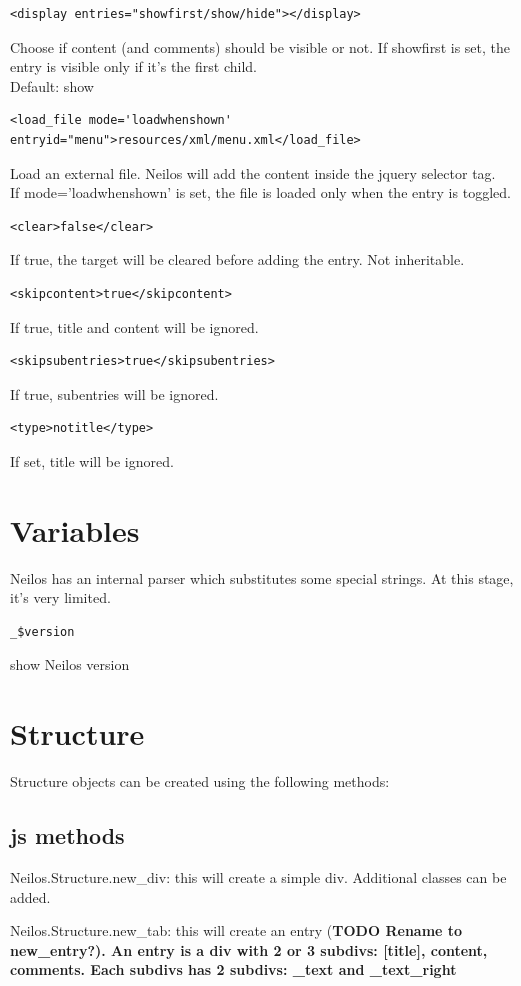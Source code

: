 \documentclass[a4paper,12pt]{article}
\begin{document}
\begin{list}{-}{}
\begin{verbatim}
<display entries="showfirst/show/hide"></display>
\end{verbatim}
Choose if content (and comments) should be visible or not. If showfirst is set, the entry is visible only if it's the first child.\\
Default: show
\item \begin{verbatim}
<load_file mode='loadwhenshown' 
entryid="menu">resources/xml/menu.xml</load_file>
      \end{verbatim}
Load an external file. Neilos will add the content inside the jquery selector tag.\\
If mode='loadwhenshown' is set, the file is loaded only when the entry is toggled.
\item \begin{verbatim}
<clear>false</clear>
\end{verbatim}
If true, the target will be cleared before adding the entry. Not inheritable.
\item \begin{verbatim}
<skipcontent>true</skipcontent>
\end{verbatim}
If true, title and content will be ignored.
\item \begin{verbatim}
<skipsubentries>true</skipsubentries>
\end{verbatim}
If true, subentries will be ignored.
\item \begin{verbatim}
<type>notitle</type>
\end{verbatim}
If set, title will be ignored.
\end{list}
\normalsize
\section{Variables}
Neilos has an internal parser which substitutes some special strings. At this stage, it's very limited.
\begin{list}{-}{}
\item \begin{verbatim}
_$version
\end{verbatim}
show Neilos version
\end{list}
\normalsize
\section{Structure}
Structure objects can be created using the following methods:
\subsection{js methods}
\begin{list}{-}{}
 \item Neilos.Structure.new\_div: this will create a simple div. Additional classes can be added.
\item Neilos.Structure.new\_tab: this will create an entry (\bfseries{TODO} \normalfont Rename to new\_entry?). An entry is a div with 2 or 3 subdivs: [title], content, comments. Each subdivs has 2 subdivs: \_text and \_text\_right
\end{list}
\end{document}
